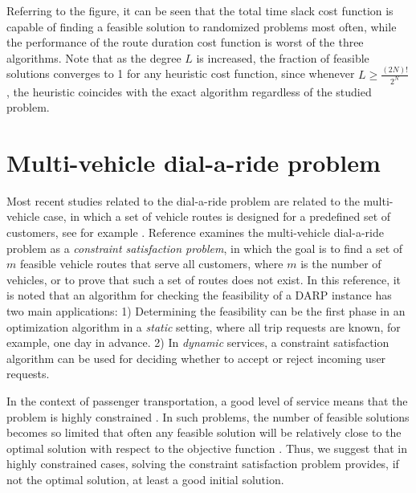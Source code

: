 \documentclass[dissertation,draft*]{aaltoseries}
\begin{document}
Referring to the figure, it can be seen that the total time slack cost function is capable of finding
a feasible solution to randomized problems most often, while the performance of the route duration cost
function is worst of the three algorithms. Note that as the degree $L$ is increased, 
the fraction of feasible solutions converges to 1 for any heuristic cost function, since whenever $L \geq \frac{(2N)!}{2^N}$,
the heuristic coincides with the exact algorithm regardless of the studied problem.



\section{Multi-vehicle dial-a-ride problem}
\label{multivehicle}
Most recent studies related to the dial-a-ride problem are related to the multi-vehicle case, in which 
a set of vehicle routes is designed for a predefined set of customers, see for example 
\cite{cordeau02, cordeau01, bent, ropke, xiang2006, melachrinoudis, parragh, garaix, berbegliathesis,berbegliafeas,berbegliapdp}.
Reference \cite{berbegliafeas} examines the multi-vehicle dial-a-ride problem as a \emph{constraint satisfaction problem}, in which the goal
is to find a set of $m$ feasible vehicle routes that serve all customers, where $m$ is the 
number of vehicles, or to prove that such a set of routes does not exist.
In this reference, it is noted that 
an algorithm for checking the feasibility of a DARP instance has two main applications:  
1) Determining the feasibility can be the first phase in an 
optimization algorithm in a \emph{static} setting, where all trip requests are known, for example, one day in advance. 
2) In \emph{dynamic} services, a constraint satisfaction algorithm can be used 
for deciding whether to accept or reject incoming user requests. 
% 

In the context of passenger transportation, a good level of service means that the problem is highly constrained \cite{jokinen-fists-2011}. 
In such problems, the number of feasible solutions becomes so limited that often
any feasible solution will be relatively close to the optimal solution with respect to the
objective function \cite{psaraftis02}.
Thus, we suggest that in highly constrained cases, solving the constraint satisfaction problem provides, 
if not the optimal solution, at least a good initial solution. 
\end{document}
